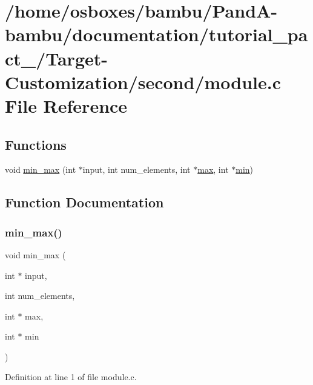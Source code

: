 \hypertarget{tutorial__pact__2019_2Target-Customization_2second_2module_8c}{}\section{/home/osboxes/bambu/\+Pand\+A-\/bambu/documentation/tutorial\+\_\+pact\+\_/\+Target-\/\+Customization/second/module.c File Reference}
\label{tutorial__pact__2019_2Target-Customization_2second_2module_8c}
\subsection*{Functions}
\begin{DoxyCompactItemize}
\item 
void \hyperlink{tutorial__pact__2019_2Target-Customization_2second_2module_8c_ac07ce44426a0d2fb3786ace2dc125567}{min\+\_\+max} (int $\ast$input, int num\+\_\+elements, int $\ast$\hyperlink{tutorial__pact__2019_2Target-Customization_2first_2hint_8c_a28f422940797ea297699ba55d89171c5}{max}, int $\ast$\hyperlink{tutorial__pact__2019_2Introduction_2sixth_2qsort_8c_abb702d8b501669a23aa0ab3b281b9384}{min})
\end{DoxyCompactItemize}


\subsection{Function Documentation}
\mbox{\label{tutorial__pact__2019_2Target-Customization_2second_2module_8c_ac07ce44426a0d2fb3786ace2dc125567}} 
\subsubsection{\texorpdfstring{min\+\_\+max()}{min\_max()}}
{\footnotesize\ttfamily void min\+\_\+max (\begin{DoxyParamCaption}\item[{int $\ast$}]{input,  }\item[{int}]{num\+\_\+elements,  }\item[{int $\ast$}]{max,  }\item[{int $\ast$}]{min }\end{DoxyParamCaption})}



Definition at line 1 of file module.\+c.

